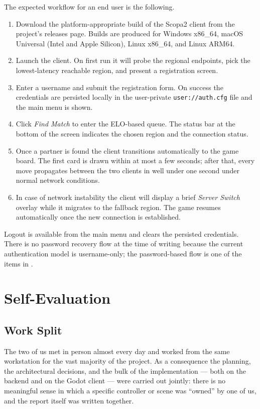 \documentclass{scrartcl}
\begin{document}
The expected workflow for an end user is the following.

\begin{enumerate}[leftmargin=1.6em]
  \item Download the platform-appropriate build of the Scopa2 client
  from the project's releases page. Builds are produced for Windows
  x86\_64, macOS Universal (Intel and Apple Silicon), Linux x86\_64,
  and Linux ARM64.
  \item Launch the client. On first run it will probe the regional
  endpoints, pick the lowest-latency reachable region, and present a
  registration screen.
  \item Enter a username and submit the registration form. On success
  the credentials are persisted locally in the
  user-private \texttt{user://auth.cfg} file and the main menu is
  shown.
  \item Click \emph{Find Match} to enter the ELO-based queue. The
  status bar at the bottom of the screen indicates the chosen region
  and the connection status.
  \item Once a partner is found the client transitions automatically
  to the game board. The first card is drawn within at most a few
  seconds; after that, every move propagates between the two clients
  in well under one second under normal network conditions.
  \item In case of network instability the client will display a
  brief \emph{Server Switch} overlay while it migrates to the
  fallback region. The game resumes automatically once the new
  connection is established.
\end{enumerate}

Logout is available from the main menu and clears the persisted
credentials. There is no password recovery flow at the time of
writing because the current authentication model is username-only;
the password-based flow is one of the items in
.

\section{Self-Evaluation}\label{self-evaluation}

\subsection{Work Split}

The two of us met in person almost every day and worked from the same
workstation for the vast majority of the project. As a consequence the
planning, the architectural decisions, and the bulk of the
implementation --- both on the backend and on the Godot client --- were
carried out jointly: there is no meaningful sense in which a specific
controller or scene was ``owned'' by one of us, and the report itself
was written together.
\end{document}
